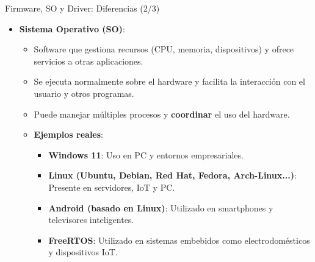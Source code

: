\documentclass{beamer}
\begin{document}
\begin{frame}{Firmware, SO y Driver: Diferencias (2/3)}
    \begin{itemize}
        \item \textbf{Sistema Operativo (SO)}:
            \begin{itemize}
                \item Software que gestiona recursos (CPU, memoria, dispositivos) y ofrece servicios a otras aplicaciones.
                \item Se ejecuta normalmente sobre el hardware y facilita la interacción con el usuario y otros programas.
                \item Puede manejar múltiples procesos y \textbf{coordinar} el uso del hardware.
                \item \textbf{Ejemplos reales}:
                    \begin{itemize}
                        \item \textbf{Windows 11}: Uso en PC y entornos empresariales.
                        \item \textbf{Linux (Ubuntu, Debian, Red Hat, Fedora, Arch-Linux...)}: Presente en servidores, IoT y PC.
                        \item \textbf{Android (basado en Linux)}: Utilizado en smartphones y televisores inteligentes.
                        \item \textbf{FreeRTOS}: Utilizado en sistemas embebidos como electrodomésticos y dispositivos IoT.
                    \end{itemize}
            \end{itemize}
    \end{itemize}
\end{frame}
\end{document}
